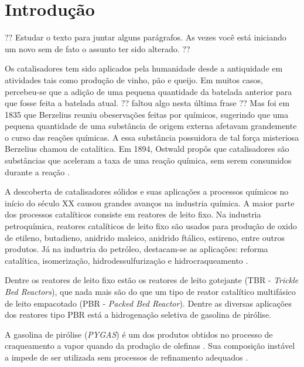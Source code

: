 %
% 
%
\chapter{Introdução} \label{chap:introducao}

?? Estudar o texto para juntar alguns parágrafos. As vezes você está iniciando
um novo sem de fato o assunto ter sido alterado. ??

Os catalisadores tem sido aplicados pela humanidade desde a antiquidade
em atividades tais como produção de vinho, pão e queijo. Em muitos
casos, percebeu-se que a adição de uma pequena quantidade da batelada anterior
para que fosse feita a batelada atual. ?? faltou algo nesta última frase ??
Mas foi em 1835 que Berzelius reuniu obeservações feitas por químicos, sugerindo
que uma pequena quantidade de uma substância de origem externa afetavam grandemente o
curso das reações químicas. A essa substância possuidora de tal força
misteriosa Berzelius chamou de catalítica. Em 1894, Ostwald propôs que
catalisadores são substâncias que aceleram a taxa de uma reação química, sem
serem consumidos durante a reação \cite{Oyama1988}.

A descoberta de catalisadores sólidos e suas aplicações a processos químicos no
início do século XX causou grandes avanços na industria química. A maior parte
dos processos catalíticos consiste em reatores de leito fixo. Na industria
petroquímica, reatores catalíticos de leito fixo são usados para produção de
oxido de etileno, butadieno, anidrido maleico, anidrido ftálico, estireno,
entre outros produtos. Já na industria do petróleo, destacam-se as aplicações:
reforma catalítica, isomerização, hidrodessulfurização e hidrocraqueamento
\cite{Froment2011}.

Dentre os reatores de leito fixo estão os reatores de leito gotejante
(TBR - \emph{Trickle Bed Reactors}), que nada mais são do que um tipo de reator
catalítico multifásico de leito empacotado (PBR - \emph{Packed Bed Reactor}).
Dentre as diversas aplicações dos reatores tipo PBR está a hidrogenação
seletiva de gasolina de pirólise.

A gasolina de pirólise (\emph{PYGAS}) é um dos produtos obtidos no processo de
craqueamento a vapor quando da produção de olefinas \cite{Cheng1986}. Sua
composição instável a impede de ser utilizada sem processos de refinamento
adequados \cite{Derrien1986}.

